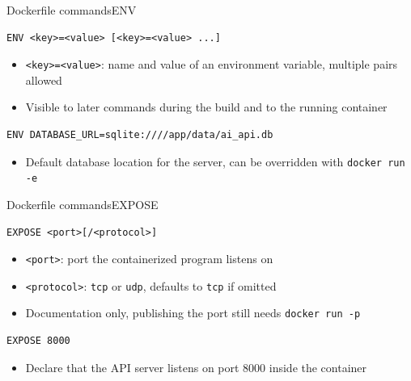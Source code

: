 \documentclass[aspectratio=169]{beamer}
\begin{document}
\begin{frame}[fragile]{Dockerfile commands}{ENV}
  \begin{verbatim}
ENV <key>=<value> [<key>=<value> ...]
  \end{verbatim}
  \begin{itemize}
    \item \texttt{<key>=<value>}: name and value of an environment variable, multiple pairs allowed
    \item Visible to later commands during the build and to the running container
  \end{itemize}

  \vspace{1em}

  \begin{verbatim}
ENV DATABASE_URL=sqlite:////app/data/ai_api.db
  \end{verbatim}
  \begin{itemize}
    \item Default database location for the server, can be overridden with \texttt{docker run -e}
  \end{itemize}

\note{
}
\end{frame}


\begin{frame}[fragile]{Dockerfile commands}{EXPOSE}
  \begin{verbatim}
EXPOSE <port>[/<protocol>]
  \end{verbatim}
  \begin{itemize}
    \item \texttt{<port>}: port the containerized program listens on
    \item \texttt{<protocol>}: \texttt{tcp} or \texttt{udp}, defaults to \texttt{tcp} if omitted
    \item Documentation only, publishing the port still needs \texttt{docker run -p}
  \end{itemize}

  \vspace{1em}

  \begin{verbatim}
EXPOSE 8000
  \end{verbatim}
  \begin{itemize}
    \item Declare that the API server listens on port 8000 inside the container
  \end{itemize}

\note{
}
\end{frame}
\end{document}
